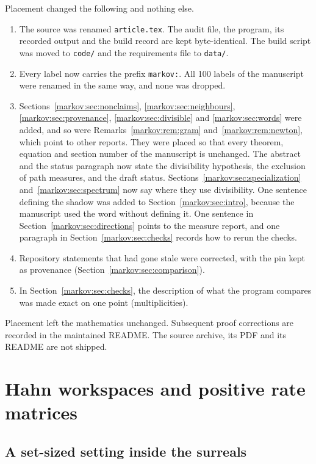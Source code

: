 \documentclass[11pt]{article}
\numberwithin{equation}{section}
\theoremstyle{definition}
\theoremstyle{remark}
\begin{document}
Placement changed the following and nothing else.
\begin{enumerate}[label=(\alph*)]
\item The source was renamed \texttt{article.tex}. The audit file, the program,
its recorded output and the build record are kept byte-identical. The build
script was moved to \texttt{code/} and the requirements file to
\texttt{data/}.
\item Every label now carries the prefix \texttt{markov:}. All 100 labels of
the manuscript were renamed in the same way, and none was dropped.
\item Sections~\ref{markov:sec:nonclaims}, \ref{markov:sec:neighbours},
\ref{markov:sec:provenance}, \ref{markov:sec:divisible} and
\ref{markov:sec:words} were added, and so were
Remarks~\ref{markov:rem:gram} and~\ref{markov:rem:newton}, which point to
other reports. They were placed so that every theorem, equation and section
number of the manuscript is unchanged. The abstract
and the status paragraph now state the divisibility hypothesis, the exclusion of
path measures, and the draft status. Sections~\ref{markov:sec:specialization}
and~\ref{markov:sec:spectrum} now say where they use divisibility. One sentence
defining the shadow was added to Section~\ref{markov:sec:intro}, because the
manuscript used the word without defining it. One sentence in
Section~\ref{markov:sec:directions} points to the measure report, and one
paragraph in Section~\ref{markov:sec:checks} records how to rerun the checks.
\item Repository statements that had gone stale were corrected, with the pin kept
as provenance (Section~\ref{markov:sec:comparison}).
\item In Section~\ref{markov:sec:checks}, the description of what the program
compares was made exact on one point (multiplicities).
\end{enumerate}
Placement left the mathematics unchanged. Subsequent proof corrections are
recorded in the maintained README. The source archive, its PDF and
its README are not shipped.

\section{Hahn workspaces and positive rate matrices}\label{markov:sec:workspace}

\subsection{A set-sized setting inside the surreals}
\end{document}
